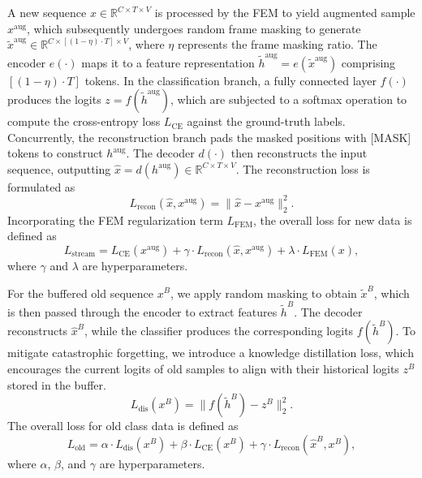 \documentclass[journal]{IEEEtran}
\begin{document}
A new sequence $x \in \mathbb{R}^{C \times T \times V}$ is processed by the FEM to yield augmented
sample $x^{\text{aug}}$, which subsequently undergoes random frame masking to generate $\tilde{x}^{\text{aug}} \in \mathbb{R}^{C \times [(1-\eta)\cdot T] \times V}$, where $\eta$ represents the frame masking ratio.
The encoder $e(\cdot)$ maps it to a feature representation $\tilde{h}^{\text{aug}} = e(\tilde{x}^{\text{aug}})$ comprising $[(1-\eta)\cdot T]$ tokens.
In the classification branch, a fully connected layer $f(\cdot)$ produces the logits $z = f(\tilde{h}^{\text{aug}})$, which are subjected to a softmax operation to compute the cross-entropy loss $L_{\text{CE}}$ against the ground-truth labels.
Concurrently, the reconstruction branch pads the masked positions with [MASK] tokens to construct $h^{\text{aug}}$. 
The decoder $d(\cdot)$ then reconstructs the input sequence, outputting $\hat{x} = d(h^{\text{aug}}) \in \mathbb{R}^{C \times T \times V}$. The reconstruction loss is formulated as
\begin{equation}
L_{\text{recon}}(\hat{x}, x^{\text{aug}}) = \|\hat{x} - x^{\text{aug}}\|_2^2.
\end{equation}
Incorporating the FEM regularization term $L_{\text{FEM}}$, the overall loss for new data is defined as
\begin{equation}
L_{\text{stream}} = L_{\text{CE}}(x^{\text{aug}}) + \gamma \cdot L_{\text{recon}}(\hat{x}, x^{\text{aug}}) + \lambda \cdot L_{\text{FEM}}(x),
\end{equation}
where $\gamma$ and $\lambda$ are hyperparameters.

For the buffered old sequence $x^B$, we apply random masking to obtain $\tilde{x}^B$, which is then passed through the encoder to extract features $\tilde{h}^B$. 
The decoder reconstructs $\hat{x}^B$, while the classifier produces the corresponding logits $f(\tilde{h}^B)$. 
To mitigate catastrophic forgetting, we introduce a knowledge distillation loss, which encourages the current logits of old samples to align with their historical logits $z^B$ stored in the buffer.
\begin{equation}
L_{\text{dis}}(x^B) = \|f(\tilde{h}^B) - z^B\|_2^2.
\end{equation}
The overall loss for old class data is defined as
\begin{equation}
L_{\text{old}} = \alpha \cdot L_{\text{dis}}(x^B) + \beta \cdot L_{\text{CE}}(x^B) + \gamma \cdot L_{\text{recon}}(\hat{x}^B, x^B),
\end{equation}
where $\alpha$, $\beta$, and $\gamma$ are hyperparameters.
\end{document}

